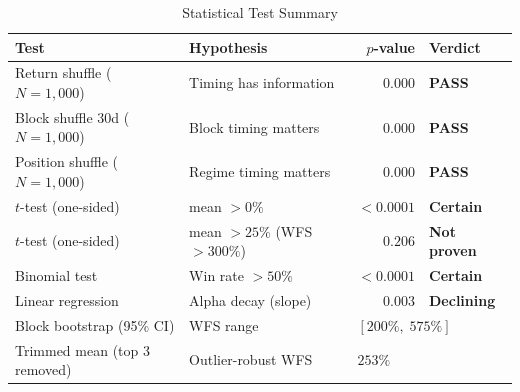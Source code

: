 \begin{table}[htbp]
\centering
\caption{Statistical Test Summary}
\label{tab:stats}
\begin{tabular}{llrl}
\toprule
Test & Hypothesis & $p$-value & Verdict \\
\midrule
Return shuffle ($N=1{,}000$) & Timing has information & $0.000$ & \textbf{PASS} \\
Block shuffle 30d ($N=1{,}000$) & Block timing matters & $0.000$ & \textbf{PASS} \\
Position shuffle ($N=1{,}000$) & Regime timing matters & $0.000$ & \textbf{PASS} \\
\midrule
$t$-test (one-sided) & mean $> 0\%$ & $< 0.0001$ & \textbf{Certain} \\
$t$-test (one-sided) & mean $> 25\%$ (WFS $> 300\%$) & $0.206$ & \textbf{Not proven} \\
Binomial test & Win rate $> 50\%$ & $< 0.0001$ & \textbf{Certain} \\
\midrule
Linear regression & Alpha decay (slope) & $0.003$ & \textbf{Declining} \\
\midrule
Block bootstrap (95\% CI) & WFS range & \multicolumn{2}{l}{$[200\%,\; 575\%]$} \\
Trimmed mean (top 3 removed) & Outlier-robust WFS & \multicolumn{2}{l}{$253\%$} \\
\bottomrule
\end{tabular}
\end{table}

